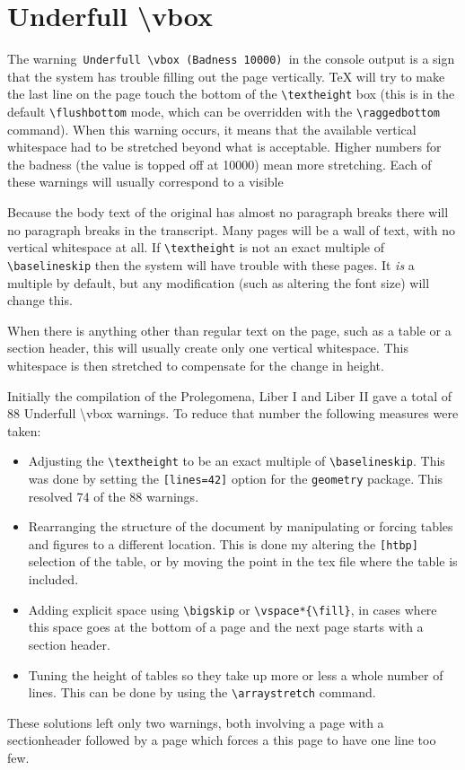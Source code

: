 \documentclass{report}
\begin{document}
\section{Underfull \textbackslash vbox}
The warning\verb+ Underfull \vbox (Badness 10000) +in the console output is
a sign that the system has trouble filling out the page vertically.
\TeX{} will try to make the last line on the page touch the bottom
of the \verb+\textheight+ box (this is in the default \verb+\flushbottom+
mode, which can be overridden with the \verb+\raggedbottom+ command).
When this warning occurs, it means that
the available vertical whitespace had to be stretched beyond what is acceptable.
Higher numbers for the badness (the value is topped off at 10000) mean more
stretching.
Each of these warnings will usually correspond to a visible

Because the body text of the original has almost no paragraph breaks
there will no paragraph breaks in the transcript.
Many pages will be a wall of text, with no vertical whitespace
at all.
If \verb+\textheight+ is not an exact multiple of \verb+\baselineskip+
then the system will have trouble with these pages.
It \emph{is} a multiple by default, but any modification
(such as altering the font size) will change this.

When there is anything other than regular text on the page,
such as a table or a section header, this will usually create only one
vertical whitespace.
This whitespace is then stretched to compensate for the change in height.

Initially the compilation of the Prolegomena, Liber I and Liber II
gave a total of 88 Underfull \textbackslash vbox warnings.
To reduce that number the following measures were taken:
\begin{itemize}
\item Adjusting the \verb+\textheight+ to be an exact multiple of
 \verb+\baselineskip+. This was done by setting the \verb+[lines=42]+
option for the \verb+geometry+ package. This resolved 74 of the 88 warnings.
\item Rearranging the structure of the document by manipulating or forcing
tables and figures to a different location.
This is done my altering the \verb+[htbp]+ selection of the table,
or by moving the point in the tex file where the table is included.
\item Adding explicit space using \verb+\bigskip+ or
\verb+\vspace*{\fill}+, in cases where this space goes at the bottom of
a page and the next page starts with a section header.
\item Tuning the height of tables so they take up more or less a whole
number of lines.
This can be done by using the \verb+\arraystretch+ command.
\end{itemize}
These solutions left only two warnings, both involving a page with
a sectionheader followed by a page which forces a this page to have
one line too few.
\end{document}
